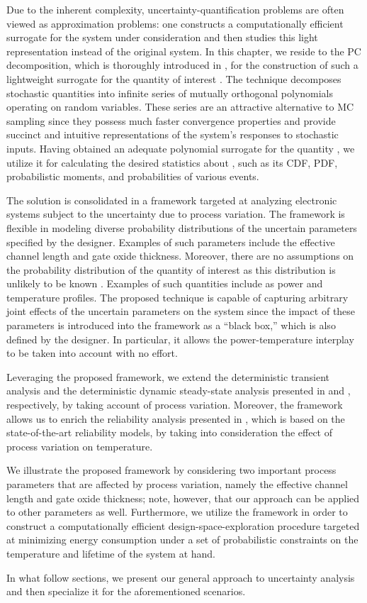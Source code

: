 Due to the inherent complexity, uncertainty-quantification problems are often
viewed as approximation problems: one constructs a computationally efficient
surrogate for the system under consideration and then studies this light
representation instead of the original system. In this chapter, we reside to the
\ac{PC} decomposition, which is thoroughly introduced in
, for the construction of such a lightweight surrogate
for the quantity of interest \g. The technique decomposes stochastic quantities
into infinite series of mutually orthogonal polynomials operating on random
variables. These series are an attractive alternative to \ac{MC} sampling since
they possess much faster convergence properties and provide succinct and
intuitive representations of the system's responses to stochastic inputs. Having
obtained an adequate polynomial surrogate for the quantity \g, we utilize it for
calculating the desired statistics about \g, such as its \ac{CDF}, \ac{PDF},
probabilistic moments, and probabilities of various events.

The solution is consolidated in a framework targeted at analyzing electronic
systems subject to the uncertainty due to process variation. The framework is
flexible in modeling diverse probability distributions of the uncertain
parameters specified by the designer. Examples of such parameters include the
effective channel length and gate oxide thickness. Moreover, there are no
assumptions on the probability distribution of the quantity of interest as this
distribution is unlikely to be known \apriori. Examples of such quantities
include as power and temperature profiles. The proposed technique is capable of
capturing arbitrary joint effects of the uncertain parameters on the system
since the impact of these parameters is introduced into the framework as a
``black box,'' which is also defined by the designer. In particular, it allows
the power-temperature interplay to be taken into account with no effort.

Leveraging the proposed framework, we extend the deterministic transient
analysis and the deterministic dynamic steady-state analysis presented in
 and , respectively, by
taking account of process variation. Moreover, the framework allows us to enrich
the reliability analysis presented in , which is based
on the state-of-the-art reliability models, by taking into consideration the
effect of process variation on temperature.

We illustrate the proposed framework by considering two important process
parameters that are affected by process variation, namely the effective channel
length and gate oxide thickness; note, however, that our approach can be applied
to other parameters as well. Furthermore, we utilize the framework in order to
construct a computationally efficient design-space-exploration procedure
targeted at minimizing energy consumption under a set of probabilistic
constraints on the temperature and lifetime of the system at hand.

In what follow sections, we present our general approach to uncertainty analysis
and then specialize it for the aforementioned scenarios.
